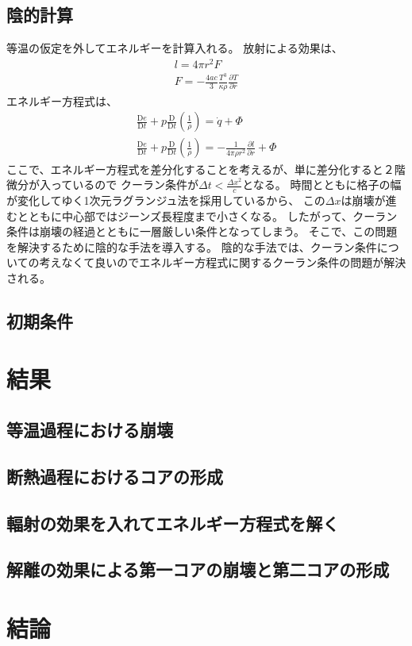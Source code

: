 \documentclass{jsarticle}
\newcommand{\pder}[2][]{\frac{\partial#1}{\partial#2}}
\newcommand{\Dder}[2][]{\frac{\mathrm{D}#1}{\mathrm{D}#2}}
\begin{document}
\subsection{陰的計算}
等温の仮定を外してエネルギーを計算入れる。
放射による効果は、
\begin{align}
    l = 4\pi r^2 F\\
    F = - \frac{4ac}{3} \frac{T^3}{\kappa \rho}\pder[T]{r}
\end{align}
エネルギー方程式は、
\begin{align}
\Dder[e]{t} + p \Dder[]{t}\left(\frac{1}{\rho}\right) = \dot{q} + \Phi\\
\Dder[e]{t} + p \Dder[]{t}\left(\frac{1}{\rho}\right) = - \frac{1}{4\pi\rho r^2}\pder[l]{r} + \Phi
\end{align}    
ここで、エネルギー方程式を差分化することを考えるが、単に差分化すると２階微分が入っているので
クーラン条件が$\Delta t < \frac{\Delta x^2}{c}$となる。
時間とともに格子の幅が変化してゆく1次元ラグランジュ法を採用しているから、
この$\Delta x$は崩壊が進むとともに中心部ではジーンズ長程度まで小さくなる。
したがって、クーラン条件は崩壊の経過とともに一層厳しい条件となってしまう。
そこで、この問題を解決するために陰的な手法を導入する。
陰的な手法では、クーラン条件についての考えなくて良いのでエネルギー方程式に関するクーラン条件の問題が解決される。
\subsection{初期条件}
\section{結果}
\subsection{等温過程における崩壊}
\subsection{断熱過程におけるコアの形成}
\subsection{輻射の効果を入れてエネルギー方程式を解く}
\subsection{解離の効果による第一コアの崩壊と第二コアの形成}
\section{結論}


\end{document}
